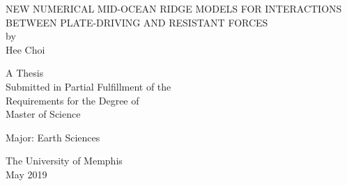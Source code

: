 \begin{titlepage}

\vspace*{.66in}
\begin{center}\uppercase{
New Numerical Mid-Ocean Ridge Models for Interactions between plate-driving and resistant forces 
}\vspace{2em}\\  %
by\\
\vspace{2em}  %
Hee Choi

\vspace{1.5in}
A Thesis \\
\vspace{14pt}
Submitted in Partial Fulfillment of the\\ \vspace{14pt}
Requirements for the Degree of\\ \vspace{14pt}
Master of Science
\vspace{0.5in}

Major: Earth Sciences

\vspace{1.66in}
The University of Memphis \\
\vspace{14pt}
May 2019
\end{center}

\end{titlepage} 
